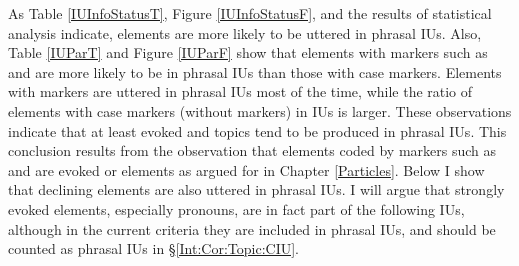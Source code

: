 As Table \ref{IUInfoStatusT}, Figure \ref{IUInfoStatusF}, and the results of statistical analysis indicate,
 elements are more likely to be uttered in phrasal IUs.
Also, Table \ref{IUParT} and Figure \ref{IUParF} show that
elements with  markers such as  and  are more likely to be in phrasal IUs than those with case markers.
Elements with  markers are uttered in phrasal IUs most of the time,
while the ratio of elements with case markers (without  markers) in  IUs is larger.
These observations indicate that
at least evoked and  topics tend to be produced in phrasal IUs.
This conclusion results from the observation that
elements coded by  markers such as  and 
are evoked or  elements as argued for in Chapter \ref{Particles}.
Below I show that declining elements are also uttered in phrasal IUs.
I will argue that strongly evoked elements, especially pronouns, are in fact part of the following IUs,
although in the current criteria they are included in phrasal IUs,
and should be counted as phrasal IUs in \S \ref{Int:Cor:Topic:CIU}.

